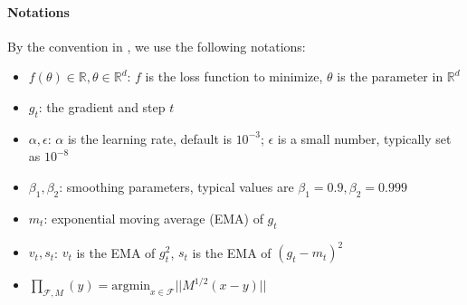 \documentclass{article}
\begin{document}
\paragraph{Notations} By the convention in \cite{kingma2014adam}, we use the following notations:
\begin{itemize}[topsep=0pt,parsep=0pt,partopsep=0pt]
\item $f(\theta) \in \mathbb{R}, \theta \in \mathbb{R}^d$: $f$ is the loss function to minimize, $\theta$ is the parameter in $\mathbb{R}^d$
\item $g_t$: the gradient and step $t$
    \item $\alpha, \epsilon$: $\alpha$ is the learning rate, default is $10^{-3}$; $\epsilon$ is a small number, typically set as $10^{-8}$
    \item $\beta_1, \beta_2$: smoothing parameters, typical values are $\beta_1=0.9, \beta_2=0.999$
    \item $m_t$: exponential moving average (EMA) of $g_t$
    \item $v_t, s_t$: $v_t$ is the EMA of $g_t^2$, $s_t$ is the EMA of $(g_t - m_t)^2$
    \item $\prod_{\mathcal{F},M}(y) = \mathrm{argmin}_{x \in \mathcal{F}} \vert \vert M^{1/2} (x-y) \vert \vert$
\end{itemize}
\end{document}
